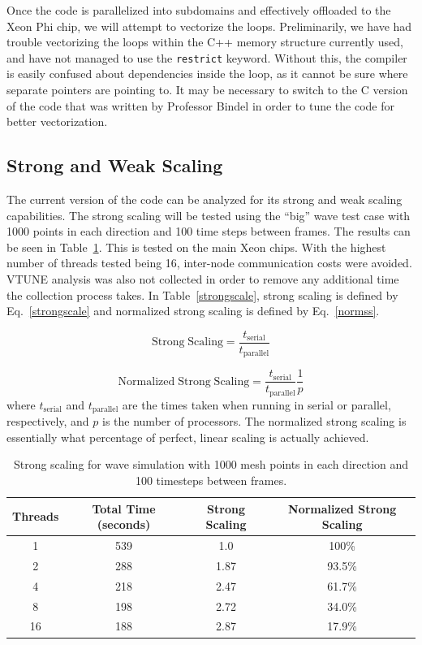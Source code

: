 \documentclass[12pt]{article}
\begin{document}
Once the code is parallelized into subdomains and effectively offloaded to the Xeon Phi chip, we will attempt to vectorize the loops. Preliminarily, we have had trouble vectorizing the loops within the C++ memory structure currently used, and have not managed to use the \texttt{restrict} keyword. Without this, the compiler is easily confused about dependencies inside the loop, as it cannot be sure where separate pointers are pointing to. It may be necessary to switch to the C version of the code that was written by Professor Bindel in order to tune the code for better vectorization.

\subsection{Strong and Weak Scaling}
The current version of the code can be analyzed for its strong and weak scaling capabilities. The strong scaling will be tested using the ``big'' wave test case with 1000 points in each direction and 100 time steps between frames. The results can be seen in Table~\ref{sstable}. This is tested on the main Xeon chips. With the highest number of threads tested being 16, inter-node communication costs were avoided. VTUNE analysis was also not collected in order to remove any additional time the collection process takes. In Table~\ref{strongscale}, strong scaling is defined by Eq.~\ref{strongscale} and normalized strong scaling is defined by Eq.~\ref{normss}.

\begin{equation}
\mathrm{Strong \; Scaling} = \frac{t_{\mathrm{serial}}}{t_{\mathrm{parallel}}}
\label{strongscale}
\end{equation}

\begin{equation}
\mathrm{Normalized \; Strong \; Scaling} = \frac{t_{\mathrm{serial}}}{t_{\mathrm{parallel}}} \frac{1}{p}
\label{normss}
\end{equation}
where $t_{\mathrm{serial}}$ and $t_{\mathrm{parallel}}$ are the times taken when running in serial or parallel, respectively, and $p$ is the number of processors. The normalized strong scaling is essentially what percentage of perfect, linear scaling is actually achieved.

\begin{table}[h]
	\begin{center}
		\begin{tabular}{|c c c c|}
			\hline
			Threads & Total Time (seconds) & Strong Scaling & Normalized Strong Scaling\\ \hline
			1 & 539 & 1.0  & 100\% \\ \hline
			2 & 288 & 1.87 &  93.5\% \\ \hline
			4 & 218 &  2.47&  61.7\%  \\ \hline
			8 & 198 &  2.72&  34.0\%  \\ \hline
			16 & 188 &  2.87& 17.9\%   \\ \hline
		\end{tabular}
		\caption{Strong scaling for wave simulation with 1000 mesh points in each direction and 100 timesteps between frames.}
		\label{sstable}
	\end{center}
\end{table}
\end{document}

